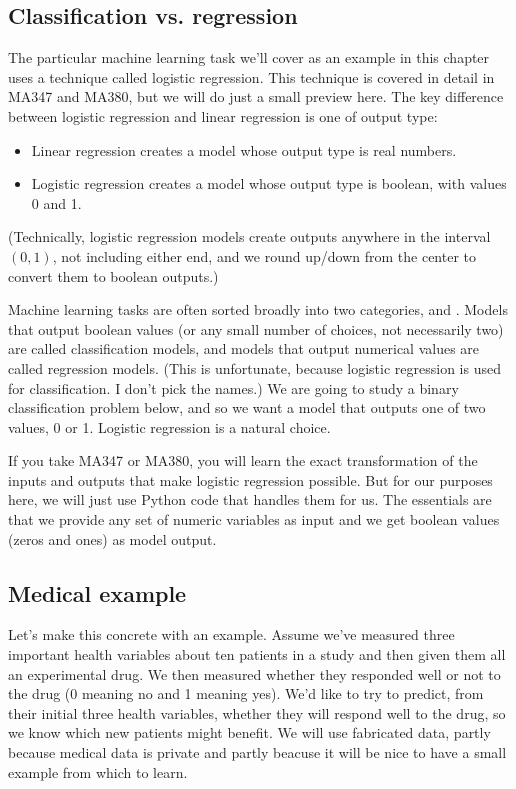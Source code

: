 \documentclass[letterpaper,10pt,english]{jupyterBook}
\begin{document}
\subsection{Classification vs. regression}
\label{\detokenize{chapter-17-machine-learning:classification-vs-regression}}
\sphinxAtStartPar
The particular machine learning task we’ll cover as an example in this chapter uses a technique called logistic regression.  This technique is covered in detail in MA347 and MA380, but we will do just a small preview here.  The key difference between logistic regression and linear regression is one of output type:
\begin{itemize}
\item {} 
\sphinxAtStartPar
Linear regression creates a model whose output type is real numbers.

\item {} 
\sphinxAtStartPar
Logistic regression creates a model whose output type is boolean, with values 0 and 1.

\end{itemize}

\sphinxAtStartPar
(Technically, logistic regression models create outputs anywhere in the interval \((0,1)\), not including either end, and we round up/down from the center to convert them to boolean outputs.)

\sphinxAtStartPar
Machine learning tasks are often sorted broadly into two categories,  and .  Models that output boolean values (or any small number of choices, not necessarily two) are called classification models, and models that output numerical values are called regression models.  (This is unfortunate, because logistic regression is used for classification.  I don’t pick the names.)  We are going to study a binary classification problem below, and so we want a model that outputs one of two values, 0 or 1.  Logistic regression is a natural choice.

\sphinxAtStartPar
If you take MA347 or MA380, you will learn the exact transformation of the inputs and outputs that make logistic regression possible.  But for our purposes here, we will just use Python code that handles them for us.  The essentials are that we provide any set of numeric variables as input and we get boolean values (zeros and ones) as model output.


\subsection{Medical example}
\label{\detokenize{chapter-17-machine-learning:medical-example}}
\sphinxAtStartPar
Let’s make this concrete with an example.  Assume we’ve measured three important health variables about ten patients in a study and then given them all an experimental drug.  We then measured whether they responded well or not to the drug (0 meaning no and 1 meaning yes).  We’d like to try to predict, from their initial three health variables, whether they will respond well to the drug, so we know which new patients might benefit.  We will use fabricated data, partly because medical data is private and partly beacuse it will be nice to have a small example from which to learn.
\end{document}
